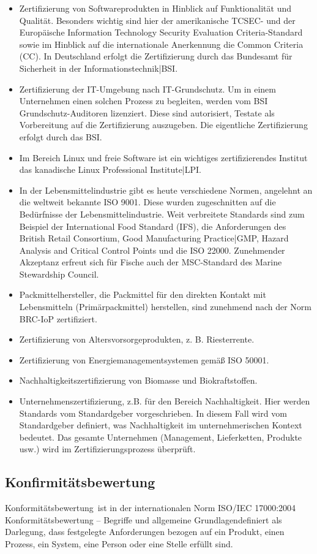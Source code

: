 \begin{itemize}
\item Zertifizierung von Softwareprodukten in Hinblick auf Funktionalität und Qualität. Besonders wichtig sind hier der amerikanische TCSEC- und der Europäische Information Technology Security Evaluation Criteria-Standard sowie im Hinblick auf die internationale Anerkennung die Common Criteria (CC). In Deutschland erfolgt die Zertifizierung durch das Bundesamt für Sicherheit in der Informationstechnik|BSI.
\item Zertifizierung der IT-Umgebung nach IT-Grundschutz. Um in einem Unternehmen einen solchen Prozess zu begleiten, werden vom BSI Grundschutz-Auditoren lizenziert. Diese sind autorisiert, Testate als Vorbereitung auf die Zertifizierung auszugeben. Die eigentliche Zertifizierung erfolgt durch das BSI.
\item Im Bereich Linux und freie Software ist ein wichtiges zertifizierendes Institut das kanadische Linux Professional Institute|LPI.
\item In der Lebensmittelindustrie gibt es heute verschiedene Normen, angelehnt an die weltweit bekannte ISO 9001. Diese wurden zugeschnitten auf die Bedürfnisse der Lebensmittelindustrie. Weit verbreitete Standards sind zum Beispiel der International Food Standard (IFS), die Anforderungen des British Retail Consortium, Good Manufacturing Practice|GMP, Hazard Analysis and Critical Control Points und die ISO 22000. Zunehmender Akzeptanz erfreut sich für Fische auch der MSC-Standard des Marine Stewardship Council.
\item Packmittelhersteller, die Packmittel für den direkten Kontakt mit Lebensmitteln (Pri\-mär\-pack\-mit\-tel) herstellen, sind zunehmend nach der Norm BRC-IoP zertifiziert.
\item Zertifizierung von Altersvorsorgeprodukten, z. B. Riesterrente.
\item Zertifizierung von Energiemanagementsystemen gemäß ISO 50001.
\item Nachhaltigkeitszertifizierung von Biomasse und Biokraftstoffen.
\item Unternehmenszertifizierung, z.B. für den Bereich Nachhaltigkeit. Hier werden Standards vom Standardgeber vorgeschrieben. In diesem Fall wird vom Standardgeber definiert, was Nachhaltigkeit im unternehmerischen Kontext bedeutet. Das gesamte Unternehmen (Management, Lieferketten, Produkte usw.) wird im Zertifizierungsprozess überprüft.
\end{itemize}

\subsection{Konfirmitätsbewertung}
\glqq Konformitätsbewertung\grqq~ist in der internationalen Norm ISO/IEC 17000:2004 \glqq Kon\-for\-mitäts\-be\-wertung – Begriffe und allgemeine Grundlagen\grqq definiert als \glqq Darlegung, dass festgelegte Anforderungen bezogen auf ein Produkt, einen Prozess, ein System, eine Person oder eine Stelle erfüllt sind\grqq.

